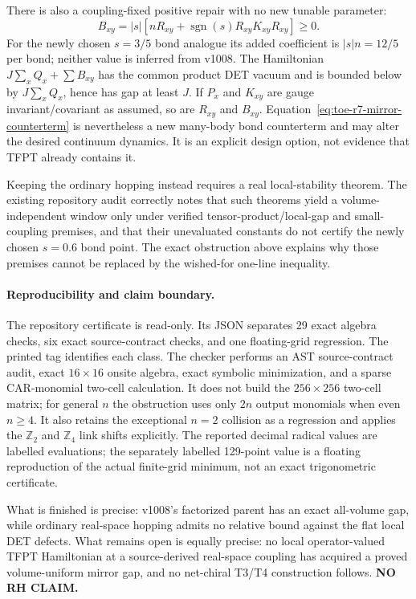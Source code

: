There is also a coupling-fixed positive repair with no new tunable parameter:
\begin{equation}
 B_{xy}=|s|\left[nR_{xy}+\operatorname{sgn}(s)
 R_{xy}K_{xy}R_{xy}\right]\geq0.
 \label{eq:toe-r7-mirror-counterterm}
\end{equation}
For the newly chosen $s=3/5$ bond analogue its added coefficient is
$|s|n=12/5$ per bond; neither value is inferred from v1008.
The Hamiltonian $J\sum_xQ_x+\sum B_{xy}$ has the common product DET vacuum and
is bounded below by $J\sum_xQ_x$, hence has gap at least $J$.  If $P_x$ and
$K_{xy}$ are gauge invariant/covariant as assumed, so are $R_{xy}$ and
$B_{xy}$.  Equation~\eqref{eq:toe-r7-mirror-counterterm} is nevertheless a new many-body
bond counterterm and may alter the desired continuum dynamics.  It is an
explicit design option, not evidence that TFPT already contains it.

Keeping the ordinary hopping instead requires a real local-stability theorem.
The existing repository audit correctly notes that such theorems yield a
volume-independent window only under verified tensor-product/local-gap and
small-coupling premises, and that their unevaluated constants do not certify
the newly chosen $s=0.6$ bond point.  The exact obstruction above explains why
those premises cannot be replaced by the wished-for one-line inequality.

\paragraph{Reproducibility and claim boundary.}

The repository certificate  is read-only.  Its JSON separates 29 exact
algebra checks, six exact source-contract checks, and one floating-grid
regression.  The printed tag identifies each class.  The checker
performs an AST source-contract audit, exact $16\times16$ onsite algebra, exact
symbolic minimization, and a sparse CAR-monomial two-cell calculation.  It does
not build the $256\times256$ two-cell matrix; for general $n$ the obstruction
uses only $2n$ output monomials when even $n\geq4$.  It also retains the
exceptional $n=2$ collision as a regression and applies the $\mathbb Z_2$ and
$\mathbb Z_4$ link shifts explicitly.  The reported decimal radical values are
labelled evaluations; the separately labelled 129-point value is a floating
reproduction of the actual finite-grid minimum, not an exact trigonometric
certificate.

What is finished is precise: v1008's factorized parent has an exact all-volume
gap, while ordinary real-space hopping admits no relative bound against the
flat local DET defects.  What remains open is equally precise: no local
operator-valued TFPT Hamiltonian at a source-derived real-space coupling has
acquired a proved volume-uniform mirror gap, and no net-chiral T3/T4
construction follows.
\textbf{NO RH CLAIM.}
\endgroup
